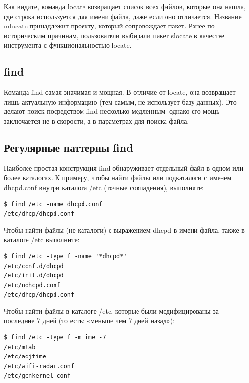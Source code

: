 \documentclass[10pt]{book}
\begin{document}
Как видите, команда locate возвращает список всех файлов, которые она нашла, где строка используется для имени файла, даже если оно отличается.
Название mlocate принадлежит проекту, который сопровождает пакет. Ранее по историческим причинам, пользователи выбирали пакет slocate в качестве инструмента с функциональностью locate.

\subsection {find}

Команда find самая значимая и мощная. В отличие от locate, она возвращает лишь актуальную информацию (тем самым, не использует базу данных). Это делают поиск посредством find несколько медленным, однако его мощь заключается не в скорости, а в параметрах для поиска файла.

\subsection {Регулярные паттерны find}

Наиболее простая конструкция find обнаруживает отдельный файл в одном или более каталогах. К примеру, чтобы найти файлы или подкаталоги с именем dhcpd.conf внутри каталога /etc (точные совпадения), выполните:

\vspace{3mm}
\begin{tcolorbox}
\begin{lstlisting}
$ find /etc -name dhcpd.conf
/etc/dhcp/dhcpd.conf
\end{lstlisting}
\end{tcolorbox}

Чтобы найти файлы (не каталоги) с выражением dhcpd в имени файла, также в каталоге /etc выполните:

\vspace{3mm}
\begin{tcolorbox}
\begin{lstlisting}
$ find /etc -type f -name '*dhcpd*'
/etc/conf.d/dhcpd
/etc/init.d/dhcpd
/etc/udhcpd.conf
/etc/dhcp/dhcpd.conf
\end{lstlisting}
\end{tcolorbox}

Чтобы найти файлы  в каталоге /etc, которые были модифицированы за последние 7 дней (то есть: «меньше чем 7 дней назад»):

\vspace{3mm}
\begin{tcolorbox}
\begin{lstlisting}
$ find /etc -type f -mtime -7
/etc/mtab
/etc/adjtime
/etc/wifi-radar.conf
/etc/genkernel.conf
\end{lstlisting}
\end{tcolorbox}
\end{document}
